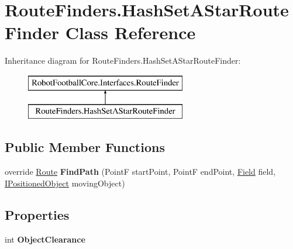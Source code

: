 \hypertarget{class_route_finders_1_1_hash_set_a_star_route_finder}{\section{Route\-Finders.\-Hash\-Set\-A\-Star\-Route\-Finder Class Reference}
\label{class_route_finders_1_1_hash_set_a_star_route_finder}
}
Inheritance diagram for Route\-Finders.\-Hash\-Set\-A\-Star\-Route\-Finder\-:\begin{figure}[H]
\begin{center}
\leavevmode
\includegraphics[height=2.000000cm]{class_route_finders_1_1_hash_set_a_star_route_finder}
\end{center}
\end{figure}
\subsection*{Public Member Functions}
\begin{DoxyCompactItemize}
\item 
\hypertarget{class_route_finders_1_1_hash_set_a_star_route_finder_a6490b9f43a0a300abc852e5d39ba9c98}{override \hyperlink{class_robot_football_core_1_1_route_objects_1_1_route}{Route} {\bfseries Find\-Path} (Point\-F start\-Point, Point\-F end\-Point, \hyperlink{class_robot_football_core_1_1_objects_1_1_field}{Field} field, \hyperlink{interface_robot_football_core_1_1_interfaces_1_1_i_positioned_object}{I\-Positioned\-Object} moving\-Object)}\label{class_route_finders_1_1_hash_set_a_star_route_finder_a6490b9f43a0a300abc852e5d39ba9c98}

\end{DoxyCompactItemize}
\subsection*{Properties}
\begin{DoxyCompactItemize}
\item 
\hypertarget{class_route_finders_1_1_hash_set_a_star_route_finder_a87c27aad368ab2aa25457ede8dbccbed}{int {\bfseries Object\-Clearance}}\label{class_route_finders_1_1_hash_set_a_star_route_finder_a87c27aad368ab2aa25457ede8dbccbed}

\end{DoxyCompactItemize}
